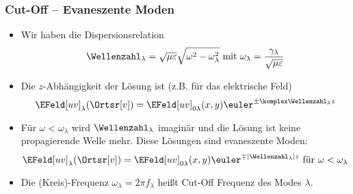 \begin{frame}
  \frametitle{Cut-Off -- Evaneszente Moden}
  \begin{itemize}[<+->]
  \item Wir haben die \alert{Dispersionsrelation}
    \begin{equation*}
      \Wellenzahl_\lambda=\sqrt{\mu\varepsilon}\sqrt{\omega^2-\omega_\lambda^2} \text{ mit } \omega_\lambda=\frac{\gamma_\lambda}{\sqrt{\mu\varepsilon}} 
    \end{equation*}
  \item Die \(z\)-Abhängigkeit der Lösung ist (z.B. für das elektrische Feld)
             \begin{equation*}
           \EFeld[uv]_\lambda(\Ortsr[v]) = \EFeld[uv]_{0\lambda}(x,y) \euler^{\pm\komplex\Wellenzahl_\lambda z}
         \end{equation*}
   \item Für \alert{\(\omega < \omega_\lambda\)} wird \(\Wellenzahl_\lambda\) \alert{imaginär} und die Lösung ist \alert{keine propagierende Welle} mehr. Diese Lösungen sind \alert{evaneszente Moden}:
\begin{equation*}
           \EFeld[uv]_\lambda(\Ortsr[v]) = \EFeld[uv]_{0\lambda}(x,y) \euler^{\mp|\Wellenzahl_\lambda| z} \text{ für } \omega < \omega_\lambda
         \end{equation*}
         \item Die (Kreis)-Frequenz \(\omega_\lambda = 2\pi f_\lambda\) heißt \alert{Cut-Off Frequenz} des Modes \(\lambda\). 
 \end{itemize}
\end{frame}

